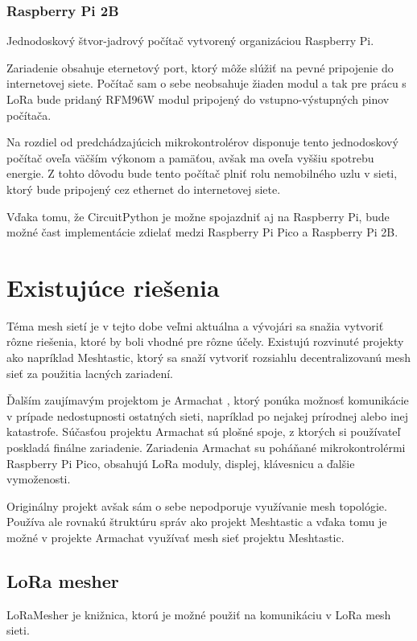 \documentclass[slovak,master]{diploma}
\begin{document}
\subsection{Raspberry Pi 2B}
Jednodoskový štvor-jadrový počítač vytvorený organizáciou Raspberry Pi.

Zariadenie obsahuje eternetový port, ktorý môže slúžiť na pevné pripojenie do internetovej siete.
Počítač sam o sebe neobsahuje žiaden modul a tak pre prácu s LoRa bude pridaný RFM96W modul pripojený do vstupno-výstupných pinov počítača.

Na rozdiel od predchádzajúcich mikrokontrolérov disponuje tento jednodoskový počítač oveľa väčším výkonom a pamäťou, 
avšak ma oveľa vyššiu spotrebu energie. Z tohto dôvodu bude tento počítač plniť rolu nemobilného uzlu v sieti, ktorý bude pripojený cez ethernet do internetovej siete.

Vďaka tomu, že CircuitPython je možne spojazdniť aj na Raspberry Pi, bude možné čast implementácie zdielať medzi Raspberry Pi Pico a Raspberry Pi 2B.


\chapter{Existujúce riešenia}
Téma mesh sietí je v tejto dobe veľmi aktuálna a vývojári sa snažia vytvoriť rôzne riešenia, ktoré by boli vhodné pre rôzne účely.
Existujú rozvinuté projekty ako napríklad Meshtastic, ktorý sa snaží vytvoriť rozsiahlu decentralizovanú mesh sieť za použitia lacných zariadení.

Ďalším zaujímavým projektom je Armachat \cite{armachat}, ktorý ponúka možnosť komunikácie v prípade nedostupnosti ostatných sieti, napríklad po nejakej prírodnej alebo inej katastrofe.
Súčasťou projektu Armachat sú plošné spoje, z ktorých si používateľ poskladá finálne zariadenie.
Zariadenia Armachat su poháňané mikrokontrolérmi Raspberry Pi Pico, obsahujú LoRa moduly, displej, klávesnicu a ďalšie vymoženosti.

Originálny projekt avšak sám o sebe nepodporuje využívanie mesh topológie. Používa ale rovnakú štruktúru správ ako projekt Meshtastic a vďaka tomu je možné 
v projekte Armachat využívať mesh sieť projektu Meshtastic.

\section{LoRa mesher}
LoRaMesher \cite{loramesher} je knižnica, ktorú je možné použiť na komunikáciu v LoRa mesh sieti.
\end{document}
